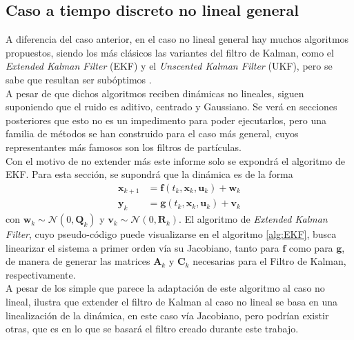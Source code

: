 \subsection{Caso a tiempo discreto no lineal general}
A diferencia del caso anterior, en el caso no lineal general hay muchos algoritmos propuestos, siendo los más clásicos las variantes del filtro de Kalman, como el \textit{Extended Kalman Filter} (EKF) y el \textit{Unscented Kalman Filter} (UKF), pero se sabe que resultan ser subóptimos \cite{Setoodeh2022NonlinearApplications}.\\ 
A pesar de que dichos algoritmos reciben dinámicas no lineales, siguen suponiendo que el ruido es aditivo, centrado y Gaussiano. Se verá en secciones posteriores que esto no es un impedimento para poder ejecutarlos, pero una familia de métodos se han construido para el caso más general, cuyos representantes más famosos son los filtros de partículas.\\
Con el motivo de no extender más este informe solo se expondrá el algoritmo de EKF. Para esta sección, se supondrá que la dinámica es de la forma
\begin{equation}
	\begin{aligned}
		\mathbf{x}_{k+1} &= \mathbf{f}(t_k, \mathbf{x}_k, \mathbf{u}_k) + \mathbf{w}_k \\
		\mathbf{y}_k &= \mathbf{g}(t_k, \mathbf{x}_k, \mathbf{u}_k) + \mathbf{v}_k 
	\end{aligned}
	\label{eq:no_lin_disc_add}
\end{equation} 
con $\mathbf{w}_k \sim \mathcal{N}(0, \mathbf{Q}_k)$ y $\mathbf{v}_k \sim \mathcal{N}(0, \mathbf{R}_k)$. 
El algoritmo de \textit{Extended Kalman Filter}, cuyo pseudo-código puede visualizarse en el algoritmo \ref{alg:EKF}, busca linearizar el sistema a primer orden vía su Jacobiano, tanto para $\mathbf{f}$ como para $\mathbf{g}$, de manera de generar las matrices $\mathbf{A}_k$ y $\mathbf{C}_k$ necesarias para el Filtro de Kalman, respectivamente. \\
A pesar de los simple que parece la adaptación de este algoritmo al caso no lineal, ilustra que extender el filtro de Kalman al caso no lineal se basa en una linealización de la dinámica, en este caso vía Jacobiano, pero podrían existir otras, que es en lo que se basará el filtro creado durante este trabajo.

